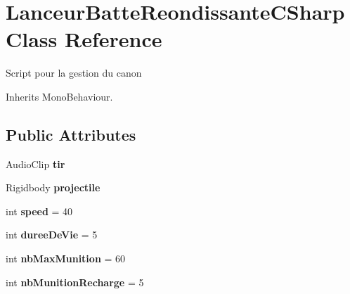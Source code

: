 \hypertarget{class_lanceur_batte_reondissante_c_sharp}{\section{Lanceur\+Batte\+Reondissante\+C\+Sharp Class Reference}
\label{class_lanceur_batte_reondissante_c_sharp}
}


Script pour la gestion du canon  




Inherits Mono\+Behaviour.

\subsection*{Public Attributes}
\begin{DoxyCompactItemize}
\item 
\hypertarget{class_lanceur_batte_reondissante_c_sharp_a4e8762b0c65c7b37d7f7c3ad0892fe4c}{Audio\+Clip {\bfseries tir}}\label{class_lanceur_batte_reondissante_c_sharp_a4e8762b0c65c7b37d7f7c3ad0892fe4c}

\item 
\hypertarget{class_lanceur_batte_reondissante_c_sharp_a2fc7cf79b155d327b5f3aa183c34ef1e}{Rigidbody {\bfseries projectile}}\label{class_lanceur_batte_reondissante_c_sharp_a2fc7cf79b155d327b5f3aa183c34ef1e}

\item 
\hypertarget{class_lanceur_batte_reondissante_c_sharp_aeb4a257dab5cfcac40e5396ab211a455}{int {\bfseries speed} = 40}\label{class_lanceur_batte_reondissante_c_sharp_aeb4a257dab5cfcac40e5396ab211a455}

\item 
\hypertarget{class_lanceur_batte_reondissante_c_sharp_a36ab09b1ae4aed4cc432cc89289d82a4}{int {\bfseries duree\+De\+Vie} = 5}\label{class_lanceur_batte_reondissante_c_sharp_a36ab09b1ae4aed4cc432cc89289d82a4}

\item 
\hypertarget{class_lanceur_batte_reondissante_c_sharp_a220cd72c5c5407375f806ba2eebe055b}{int {\bfseries nb\+Max\+Munition} = 60}\label{class_lanceur_batte_reondissante_c_sharp_a220cd72c5c5407375f806ba2eebe055b}

\item 
\hypertarget{class_lanceur_batte_reondissante_c_sharp_a36dcb4cecfd5d8d5caa2c0d0be1b09e1}{int {\bfseries nb\+Munition\+Recharge} = 5}\label{class_lanceur_batte_reondissante_c_sharp_a36dcb4cecfd5d8d5caa2c0d0be1b09e1}


\end{DoxyCompactItemize}
